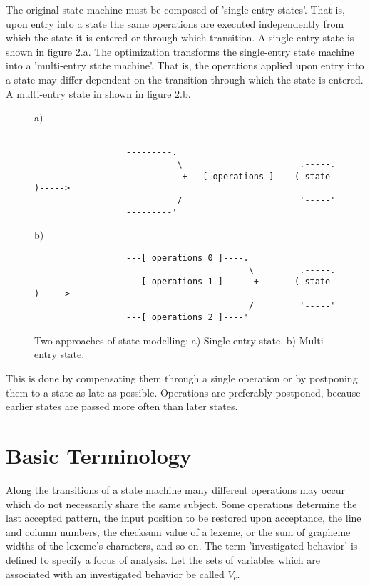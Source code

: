 \documentclass[12pt,a4paper]{scrartcl}
\begin{document}
The original state machine must be composed of 'single-entry states'. That is,
upon entry into a state the same operations are executed independently from
which the state it is entered or through which transition.  A single-entry
state is shown in figure 2.a. The optimization transforms the single-entry
state machine into a 'multi-entry state machine'.  That is, the operations
applied upon entry into a state may differ dependent on the transition through
which the state is entered. A multi-entry state in shown in figure 2.b.

\begin{figure}[htbp] \leavevmode
a)

\begin{verbatim}
     
                  ---------.
                            \                       .-----.
                  -----------+---[ operations ]----( state )----->   
                            /                       '-----'
                  ---------'       
\end{verbatim}
     
b)
     
\begin{verbatim}
                  ---[ operations 0 ]----.
                                          \         .-----.
                  ---[ operations 1 ]------+-------( state )----->  
                                          /         '-----'
                  ---[ operations 2 ]----'       

\end{verbatim}
\caption{Two approaches of state modelling: a) Single entry state. 
b) Multi-entry state.}
\end{figure}


This is done by compensating them through a single operation or by
postponing them to a state as late as possible.  Operations are preferably
postponed, because earlier states are passed more often than later states.

%
\section{Basic Terminology}

Along the transitions of a state machine many different operations may occur
which do not necessarily share the same subject. Some operations determine the
last accepted pattern, the input position to be restored upon acceptance, the
line and column numbers, the checksum value of a lexeme, or the sum of grapheme
widths of the lexeme's characters, and so on. The term 'investigated behavior'
is defined to specify a focus of analysis.  Let the sets of variables which are
associated with an investigated behavior be called $V_c$.
\end{document}
